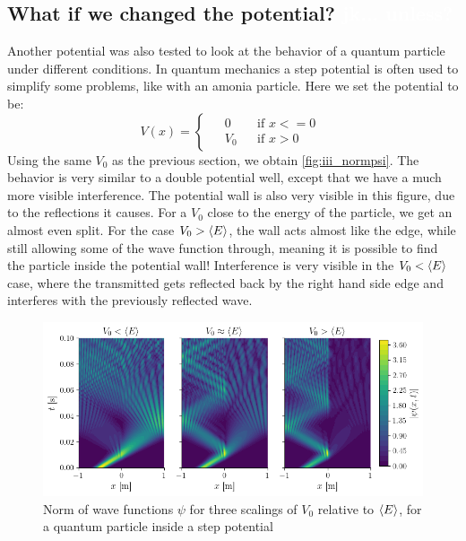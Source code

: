 \subsection{What if we changed the potential? \textcolor{white}{jk... unless?}}

Another potential was also tested to look at the behavior of a quantum particle under different conditions. In quantum mechanics a step potential is often used to simplify some problems, like with an amonia particle. Here we set the potential to be:
\begin{equation}
    V(x) = \begin{cases}
        \begin{aligned}
            &0 &&\textrm{if } x <= 0 \\
            &V_0 &&\textrm{if } x > 0
        \end{aligned}
    \end{cases}
\end{equation}
Using the same \(V_0\) as the previous section, we obtain \autoref{fig:iii_normpsi}. The behavior is very similar to a double potential well, except that we have a much more visible interference. The potential wall is also very visible in this figure, due to the reflections it causes. For a \(V_0\) close to the energy of the particle, we get an almost even split. For the case \(V_0 > \langle E \rangle\), the wall acts almost like the edge, while still allowing some of the wave function through, meaning it is possible to find the particle inside the potential wall! Interference is very visible in the \(V_0 < \langle E \rangle\) case, where the transmitted gets reflected back by the right hand side edge and interferes with the previously reflected wave.

\begin{figure}[h]
    \centering
    \includegraphics[width=\linewidth]{figures/iii_normpsi.png}
    \caption{Norm of wave functions $\psi$ for three scalings of $V_0$ relative to $\langle E \rangle$, for a quantum particle inside a step potential}
    \label{fig:iii_normpsi}
\end{figure}

